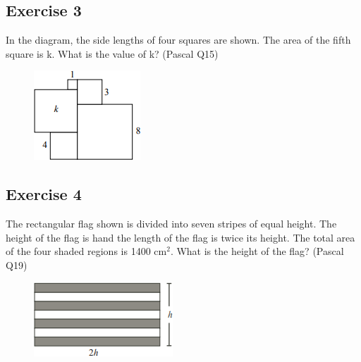 \documentclass[12pt]{article}
\begin{document}
\subsection*{Exercise 3}
In the diagram, the side lengths of four squares are shown. The area of the fifth square is k. What is the value of k? (Pascal Q15)
\vspace*{-0.1in}
\begin{figure}[h]
    \includegraphics[scale=0.90]{image3.png}
\end{figure}

\subsection*{Exercise 4}
The rectangular flag shown is divided into seven stripes of equal height. The height of the flag is hand the length of the flag is twice its height. The total area of the four shaded regions is 1400 cm$^2$. What is the height of the flag? (Pascal Q19)
\begin{figure}[h]
    \includegraphics[scale = 0.75]{image4.png}
\end{figure}
\end{document}
